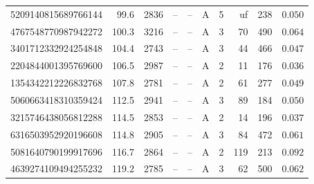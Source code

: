 \begin{longtable}{lrrlrlcrrr}
5209140815689766144 & 99.6 & 2836 & -- & -- & A & 5 & uf & 238 & $0.050$ \\
4767548770987942272 & 100.3 & 3216 & -- & -- & A & 3 & 70 & 490 & $0.064$ \\
3401712332924254848 & 104.4 & 2743 & -- & -- & A & 3 & 44 & 466 & $0.047$ \\
2204844001395769600 & 106.5 & 2987 & -- & -- & A & 2 & 11 & 176 & $0.036$ \\
1354342212226832768 & 107.8 & 2781 & -- & -- & A & 2 & 61 & 277 & $0.049$ \\
5060663418310359424 & 112.5 & 2941 & -- & -- & A & 3 & 89 & 184 & $0.050$ \\
3215746438056812288 & 114.5 & 2853 & -- & -- & A & 2 & 14 & 196 & $0.037$ \\
6316503952920196608 & 114.8 & 2905 & -- & -- & A & 3 & 84 & 472 & $0.061$ \\
5081640790199917696 & 116.7 & 2864 & -- & -- & A & 2 & 119 & 213 & $0.092$ \\
4639274109494255232 & 119.2 & 2785 & -- & -- & A & 3 & 62 & 500 & $0.062$ \\
\end{longtable}
